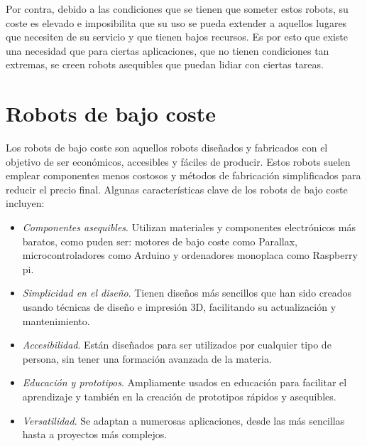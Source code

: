 \setcounter{footnote}{13} %
\setcounter{footnote}{14} %
\setcounter{footnote}{15} %

Por contra, debido a las condiciones que se tienen que someter estos robots, su coste es elevado e imposibilita que su uso se pueda extender a aquellos lugares que necesiten de su servicio y que tienen bajos recursos. Es por esto que existe una necesidad que para ciertas aplicaciones, que no tienen condiciones tan extremas, se creen robots asequibles que puedan lidiar con ciertas tareas. \\

\section{Robots de bajo coste}

Los robots de bajo coste son aquellos robots diseñados y fabricados con el objetivo de ser económicos, accesibles y fáciles de producir. Estos robots suelen emplear componentes menos costosos y métodos de fabricación simplificados para reducir el precio final. Algunas características clave de los robots de bajo coste incluyen:

\begin{itemize}
	\item \textit{Componentes asequibles}. Utilizan materiales y componentes electrónicos más baratos, como puden ser: motores de bajo coste como Parallax, microcontroladores como Arduino y ordenadores monoplaca como Raspberry pi.
	\item \textit{Simplicidad en el diseño}. Tienen diseños más sencillos que han sido creados usando técnicas de diseño e impresión 3D, facilitando su actualización y mantenimiento.
	\item \textit{Accesibilidad}. Están diseñados para ser utilizados por cualquier tipo de persona, sin tener una formación avanzada de la materia.
	\item \textit{Educación y prototipos}. Ampliamente usados en educación para facilitar el aprendizaje y también en la creación de prototipos rápidos y asequibles.
	\item \textit{Versatilidad}. Se adaptan a numerosas aplicaciones, desde las más sencillas hasta a proyectos más complejos.
	
\end{itemize}\

